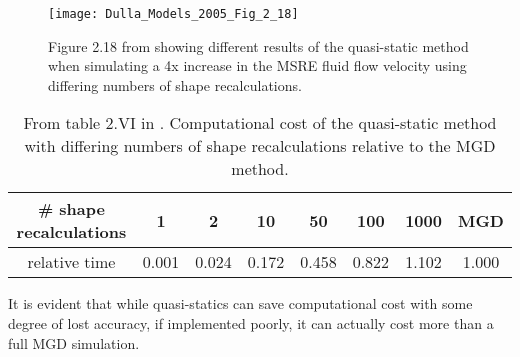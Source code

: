 \documentclass[review]{elsarticle}
\begin{document}
\begin{figure}[H]
   \centering
   \texttt{[image: Dulla\_Models\_2005\_Fig\_2\_18]}
   \caption{Figure 2.18 from \cite{dulla_models_2005} showing different results of the
   quasi-static method when simulating a 4x increase in the MSRE fluid flow velocity using
   differing numbers of shape recalculations.} 
   \label{fig:dulla_4x_qs}
\end{figure}

\begin{table}[h]
    \caption{From table 2.VI in \cite{dulla_models_2005}. Computational cost
        of the quasi-static method with differing numbers of shape
        recalculations relative to the MGD method.}
    \label{tbl:dulla_costs}
    \begin{center}
        \begin{tabular}{|c|c|c|c|c|c|c|c|}
            \hline
            \# shape recalculations & 1 & 2 & 10 & 50 & 100 & 1000 & MGD \\
            \hline
            relative time & 0.001 & 0.024 & 0.172 & 0.458 & 0.822 & 1.102 &
                1.000 \\
            \hline
        \end{tabular}
    \end{center}
\end{table}

It is evident that while quasi-statics can save computational cost with some
degree of lost accuracy, if implemented poorly, it can actually cost more than
a full MGD simulation.
\end{document}
